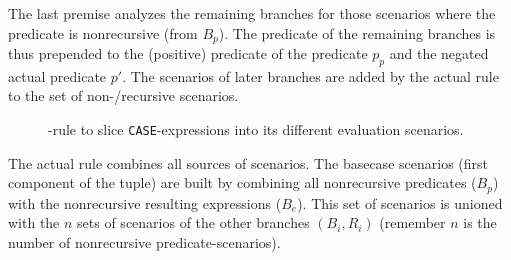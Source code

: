 The last premise analyzes the remaining branches for those scenarios where the predicate is nonrecursive (from $B_p$). The predicate of the remaining branches is thus prepended to the (positive) predicate of the predicate $p_p$ and the negated actual predicate $p'$. The scenarios of later branches are added by the actual rule to the set of non-/recursive scenarios.

\begin{figure}[h!]
    \centering\small

    \caption{\RWHEN-rule to slice \texttt{CASE}-expressions into its different evaluation scenarios.}
    \label{fig:my_label}
\end{figure}

The actual rule combines all sources of scenarios. The basecase scenarios (first component of the tuple) are built by combining all nonrecursive predicates ($B_p$) with the nonrecursive resulting expressions ($B_e$). This set of scenarios is unioned with the $n$ sets of scenarios of the other branches $(B_i, R_i)$ (remember $n$ is the number of nonrecursive predicate-scenarios).


